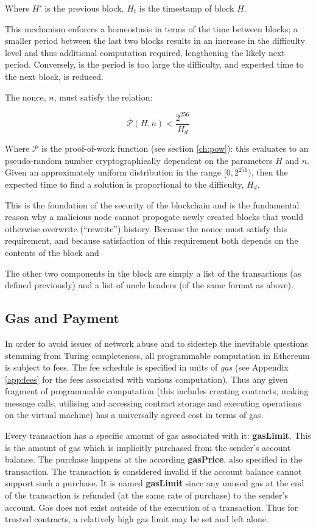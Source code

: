 \documentclass[9pt,oneside]{amsart}
\begin{document}
\begin{multicols}{2}
Where $H'$ is the previous block, $H_t$ is the timestamp of block $H$.

This mechanism enforces a homeostasis in terms of the time between blocks; a smaller period between the last two blocks results in an increase in the difficulty level and thus additional computation required, lengthening the likely next period. Conversely, is the period is too large the difficulty, and expected time to the next block, is reduced.

The nonce, $n$, must satisfy the relation:

\begin{equation}
\mathcal{P}(H, n) < \frac{2^{256}}{H_d}
\end{equation}

Where $\mathcal{P}$ is the proof-of-work function (see section \ref{ch:pow}): this evaluates to an pseudo-random number cryptographically dependent on the parameters $H$ and $n$. Given an approximately uniform distribution in the range $[0, 2^{256})$, then the expected time to find a solution is proportional to the difficulty, $H_d$.

This is the foundation of the security of the blockchain and is the fundamental reason why a malicious node cannot propogate newly created blocks that would otherwise overwrite (``rewrite'') history. Because the nonce must satisfy this requirement, and because satisfaction of this requirement both depends on the contents of the block and 

The other two components in the block are simply a list of the transactions (as defined previously) and a list of uncle headers (of the same format as above).

\subsection{Gas and Payment} \label{ch:payment}

In order to avoid issues of network abuse and to sidestep the inevitable questions stemming from Turing completeness, all programmable computation in Ethereum is subject to fees. The fee schedule is specified in units of \textit{gas} (see Appendix \ref{app:fees} for the fees associated with various computation). Thus any given fragment of programmable computation (this includes creating contracts, making message calls, utilising and accessing contract storage and executing operations on the virtual machine) has a universally agreed cost in terms of gas.

Every transaction has a specific amount of gas associated with it: \textbf{gasLimit}. This is the amount of gas which is implicitly purchased from the sender's account balance. The purchase happens at the according \textbf{gasPrice}, also specified in the transaction. The transaction is considered invalid if the account balance cannot support such a purchase. It is named \textbf{gasLimit} since any unused gas at the end of the transaction is refunded (at the same rate of purchase) to the sender's account. Gas does not exist outside of the execution of a transaction. Thus for trusted contracts, a relatively high gas limit may be set and left alone.


\end{multicols}
\end{document}
